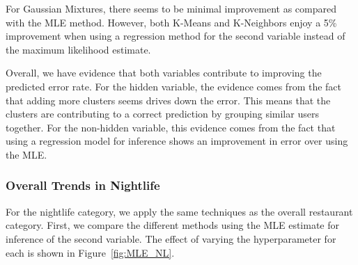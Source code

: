\documentclass[11pt]{article}
\begin{document}
For Gaussian Mixtures, there seems to be minimal improvement as compared with the MLE method. However, both K-Means and K-Neighbors enjoy a 5\% improvement when using a regression method for the second variable instead of the maximum likelihood estimate.

Overall, we have evidence that both variables contribute to improving the predicted error rate. For the hidden variable, the evidence comes from the fact that adding more clusters seems drives down the error. This means that the clusters are contributing to a correct prediction by grouping similar users together. For the non-hidden variable, this evidence comes from the fact that using a regression model for inference shows an improvement in error over using the MLE.

\subsubsection{Overall Trends in Nightlife}
For the nightlife category, we apply the same techniques as the overall restaurant category. First, we compare the different methods using the MLE estimate for inference of the second variable. The effect of varying the hyperparameter for each is shown in Figure~\ref{fig:MLE_NL}.
\end{document}

